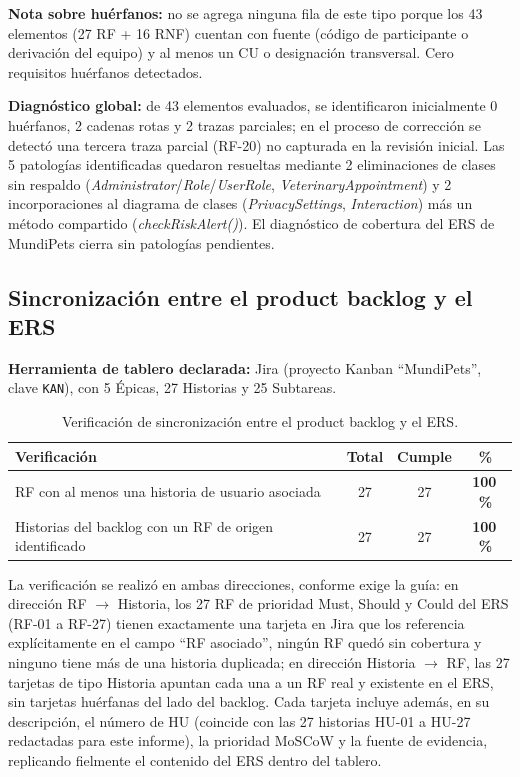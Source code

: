 \documentclass[journal,onecolumn]{IEEEtran}
\begin{document}
\noindent\textbf{Nota sobre huérfanos:} no se agrega ninguna fila de este
tipo porque los 43 elementos (27 RF + 16 RNF) cuentan con fuente (código
de participante o derivación del equipo) y al menos un CU o designación
transversal. Cero requisitos huérfanos detectados.

\noindent\textbf{Diagnóstico global:} de 43 elementos evaluados, se
identificaron inicialmente 0 huérfanos, 2 cadenas rotas y 2 trazas
parciales; en el proceso de corrección se detectó una tercera traza
parcial (RF-20) no capturada en la revisión inicial. Las 5 patologías
identificadas quedaron resueltas mediante 2 eliminaciones de clases sin
respaldo (\textit{Administrator}/\textit{Role}/\textit{UserRole},
\textit{VeterinaryAppointment}) y 2 incorporaciones al diagrama de clases
(\textit{PrivacySettings}, \textit{Interaction}) más un método compartido
(\textit{checkRiskAlert()}). El diagnóstico de cobertura del ERS de
MundiPets cierra sin patologías pendientes.

\subsection{Sincronización entre el product backlog y el ERS}

\noindent\textbf{Herramienta de tablero declarada:} Jira (proyecto
Kanban ``MundiPets'', clave \texttt{KAN}), con 5 Épicas, 27 Historias y
25 Subtareas.

\begin{table}[H]
	\centering
	\caption{Verificación de sincronización entre el product backlog y el ERS.}
	\label{tab:sync_backlog}
	\begin{tabularx}{\textwidth}{|X|c|c|c|}
		\hline
		\textbf{Verificación} & \textbf{Total} & \textbf{Cumple} & \textbf{\%} \\
		\hline
		RF con al menos una historia de usuario asociada & 27 & 27 & \textbf{100\,\%} \\
		\hline
		Historias del backlog con un RF de origen identificado & 27 & 27 & \textbf{100\,\%} \\
		\hline
	\end{tabularx}
\end{table}

La verificación se realizó en ambas direcciones, conforme exige la
guía: en dirección RF $\to$ Historia, los 27 RF de prioridad Must,
Should y Could del ERS (RF-01 a RF-27) tienen exactamente una tarjeta en
Jira que los referencia explícitamente en el campo ``RF asociado'',
ningún RF quedó sin cobertura y ninguno tiene más de una historia
duplicada; en dirección Historia $\to$ RF, las 27 tarjetas de tipo
Historia apuntan cada una a un RF real y existente en el ERS, sin
tarjetas huérfanas del lado del backlog. Cada tarjeta incluye además, en
su descripción, el número de HU (coincide con las 27 historias HU-01 a
HU-27 redactadas para este informe), la prioridad MoSCoW y la fuente de
evidencia, replicando fielmente el contenido del ERS dentro del tablero.
\end{document}
